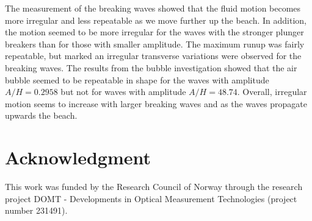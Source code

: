 \documentclass[a4paper, 11pt, english, twoside, openright]{article}
\begin{document}
The measurement of the breaking waves showed that the fluid motion becomes more irregular and less repeatable as we move further up the beach. In addition, the motion seemed to be more irregular for the waves with the stronger plunger breakers than for those with smaller amplitude. The maximum runup was fairly repeatable, but marked an irregular
transverse  variations were observed for the breaking waves. The results from the bubble investigation showed that the air bubble seemed to be repeatable in shape for the waves with amplitude $A/H=0.2958$ but not for waves with amplitude  $A/H=48.74$. Overall, irregular motion seems to increase with larger breaking waves and as the waves propagate upwards the beach.  

\section*{Acknowledgment}

This work was funded by the Research Council of Norway through the research project DOMT - Developments in Optical Measurement Technologies (project number 231491).
 

\end{document}
